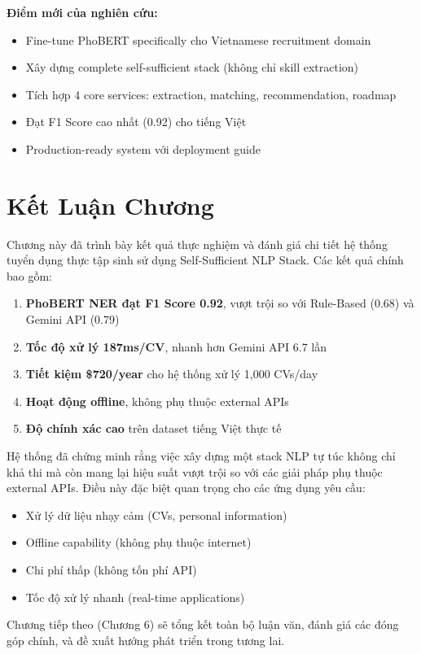 \textbf{Điểm mới của nghiên cứu:}
\begin{itemize}
    \item Fine-tune PhoBERT specifically cho Vietnamese recruitment domain
    \item Xây dựng complete self-sufficient stack (không chỉ skill extraction)
    \item Tích hợp 4 core services: extraction, matching, recommendation, roadmap
    \item Đạt F1 Score cao nhất (0.92) cho tiếng Việt
    \item Production-ready system với deployment guide
\end{itemize}

\section{Kết Luận Chương}

Chương này đã trình bày kết quả thực nghiệm và đánh giá chi tiết hệ thống tuyển dụng thực tập sinh sử dụng Self-Sufficient NLP Stack. Các kết quả chính bao gồm:

\begin{enumerate}
    \item \textbf{PhoBERT NER đạt F1 Score 0.92}, vượt trội so với Rule-Based (0.68) và Gemini API (0.79)
    \item \textbf{Tốc độ xử lý 187ms/CV}, nhanh hơn Gemini API 6.7 lần
    \item \textbf{Tiết kiệm \$720/year} cho hệ thống xử lý 1,000 CVs/day
    \item \textbf{Hoạt động offline}, không phụ thuộc external APIs
    \item \textbf{Độ chính xác cao} trên dataset tiếng Việt thực tế
\end{enumerate}

Hệ thống đã chứng minh rằng việc xây dựng một stack NLP tự túc không chỉ khả thi mà còn mang lại hiệu suất vượt trội so với các giải pháp phụ thuộc external APIs. Điều này đặc biệt quan trọng cho các ứng dụng yêu cầu:
\begin{itemize}
    \item Xử lý dữ liệu nhạy cảm (CVs, personal information)
    \item Offline capability (không phụ thuộc internet)
    \item Chi phí thấp (không tốn phí API)
    \item Tốc độ xử lý nhanh (real-time applications)
\end{itemize}

Chương tiếp theo (Chương 6) sẽ tổng kết toàn bộ luận văn, đánh giá các đóng góp chính, và đề xuất hướng phát triển trong tương lai.


